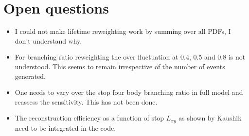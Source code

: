 \documentclass[prd,reprint,nofootinbib,notitlepage,aps,tightenlines,amsmath,amssymb,showpacs,superscriptaddress]{revtex4-1}
\begin{document}
\section{Open questions}
\begin{itemize}
    \item I could not make lifetime reweighting work by summing over all PDFs, I don't understand why. 
    \item For branching ratio reweighting the over fluctuation at 0.4, 0.5 and 0.8 is not understood. This seems to remain irrespective of the number of events generated. 
    \item One needs to vary over the stop four body branching ratio in full model and reassess the sensitivity. This has not been done. 
    \item The reconstruction efficiency as a function of stop $L_{xy}$ as shown by Kaushik need to be integrated in the code.
\end{itemize}


\end{document}
